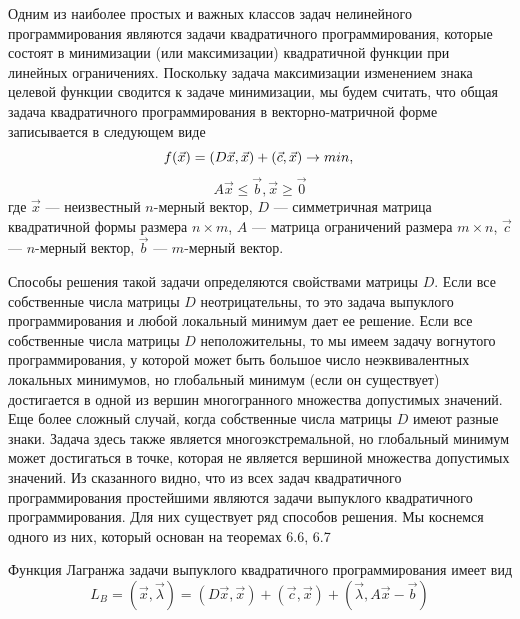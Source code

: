 {Одним из наиболее простых и важных классов задач нелинейного программирования являются задачи квадратичного программирования, которые состоят в минимизации (или максимизации) квадратичной функции при линейных ограничениях. Поскольку задача максимизации изменением знака целевой функции сводится к задаче минимизации, мы будем считать, что общая задача квадратичного программирования в векторно-матричной форме записывается в следующем виде
\begin{equation*}
  f(\vec x)  = (D\vec x,\vec x) + (\vec c, \vec x) \to min,\\
\end{equation*}
\[
 A \vec x \leqslant \vec b, \vec x \ge \vec 0
\]
 где $\vec x$ --- неизвестный $n$-мерный вектор, $D$ — симметричная матрица квадратичной формы размера $n\times m$, $A$ — матрица ограничений размера  $m\times n$, $\vec c$ --- $n$-мерный вектор,  $\vec b$ --- $m$-мерный вектор.

Способы решения такой задачи определяются свойствами матрицы $D$. Если все собственные числа матрицы $D$ неотрицательны, то это задача выпуклого программирования и любой локальный минимум дает ее решение. Если все собственные числа матрицы $D$ неположительны, то мы имеем задачу вогнутого программирования, у которой может быть большое число неэквивалентных локальных минимумов, но глобальный минимум (если он существует) достигается в одной из вершин многогранного множества допустимых значений. Еще более сложный случай, когда собственные числа матрицы $D$ имеют разные знаки. Задача здесь также является многоэкстремальной, но глобальный минимум может достигаться в точке, которая не является вершиной множества допустимых значений. Из сказанного видно, что из всех задач квадратичного программирования простейшими являются задачи выпуклого квадратичного программирования. Для них существует ряд способов решения. Мы коснемся одного из них, который основан на теоремах 6.6, 6.7

Функция Лагранжа задачи выпуклого квадратичного программирования имеет вид
\[
 L_B = (\vec x, \vec \lambda) =  (D\vec x,\vec x) + (\vec c, \vec x) + (\vec \lambda, A\vec x - \vec b)
\]

}
